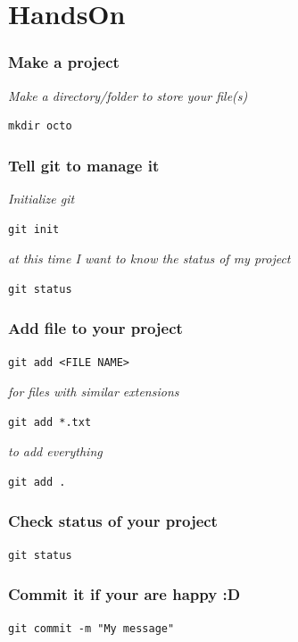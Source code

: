 \documentclass[bigger, presentation]{beamer}
\begin{document}
\section{HandsOn}
\label{sec-5}
\begin{frame}[fragile]
\frametitle{Make a project}
\label{sec-5-1}

   \emph{Make a directory/folder to store your file(s)}
     

\begin{verbatim}
mkdir octo
\end{verbatim}
\end{frame}
\begin{frame}[fragile]
\frametitle{Tell git to manage it}
\label{sec-5-2}


   \emph{Initialize git}


\begin{verbatim}
git init
\end{verbatim}

   
   \emph{at this time I want to know the status of my project}


\begin{verbatim}
git status
\end{verbatim}
\end{frame}
\begin{frame}[fragile]
\frametitle{Add file to your project}
\label{sec-5-3}


\begin{verbatim}
git add <FILE NAME>
\end{verbatim}

   \emph{for files with similar extensions}

\begin{verbatim}
git add *.txt
\end{verbatim}

   \emph{to add everything}

\begin{verbatim}
git add .
\end{verbatim}
\end{frame}
\begin{frame}[fragile]
\frametitle{Check status of your project}
\label{sec-5-4}



\begin{verbatim}
git status
\end{verbatim}
\end{frame}
\begin{frame}[fragile]
\frametitle{Commit it if your are happy :D}
\label{sec-5-5}



\begin{verbatim}
git commit -m "My message"
\end{verbatim}
\end{frame}
\end{document}
